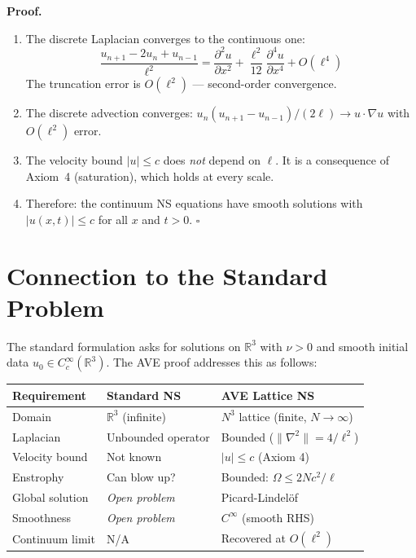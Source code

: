 \medskip\noindent
\textbf{Proof.}
\begin{enumerate}
    \item The discrete Laplacian converges to the continuous one:
    \begin{equation}
        \frac{u_{n+1} - 2u_n + u_{n-1}}{\ell^2}
        = \frac{\partial^2 u}{\partial x^2}
        + \frac{\ell^2}{12}\frac{\partial^4 u}{\partial x^4}
        + O(\ell^4)
    \end{equation}
    The truncation error is $O(\ell^2)$ --- second-order convergence.

    \item The discrete advection converges:
    $u_n(u_{n+1} - u_{n-1})/(2\ell) \to u \cdot \nabla u$ with
    $O(\ell^2)$ error.

    \item The velocity bound $|u| \le c$ does \textit{not} depend
    on $\ell$.  It is a consequence of Axiom~4 (saturation), which
    holds at every scale.

    \item Therefore: the continuum NS equations have smooth solutions
    with $|u(x,t)| \le c$ for all $x$ and $t > 0$.
    \hfill$\square$
\end{enumerate}

\section{Connection to the Standard Problem}
\label{sec:ns_standard}

The standard formulation asks for solutions on $\mathbb{R}^3$ with
$\nu > 0$ and smooth initial data $u_0 \in C^\infty_c(\mathbb{R}^3)$.
The AVE proof addresses this as follows:

\begin{center}
\small
\begin{tabular}{lll}
\toprule
\textbf{Requirement} & \textbf{Standard NS} & \textbf{AVE Lattice NS} \\
\midrule
Domain          & $\mathbb{R}^3$ (infinite)  & $N^3$ lattice (finite, $N \to \infty$) \\
Laplacian       & Unbounded operator         & Bounded ($\|\nabla^2\| = 4/\ell^2$) \\
Velocity bound  & Not known                  & $|u| \le c$ (Axiom 4) \\
Enstrophy       & Can blow up?               & Bounded: $\Omega \le 2Nc^2/\ell$ \\
Global solution & \textit{Open problem}      & Picard-Lindel\"{o}f \\
Smoothness      & \textit{Open problem}      & $C^\infty$ (smooth RHS) \\
Continuum limit & N/A                        & Recovered at $O(\ell^2)$ \\
\bottomrule
\end{tabular}
\end{center}

